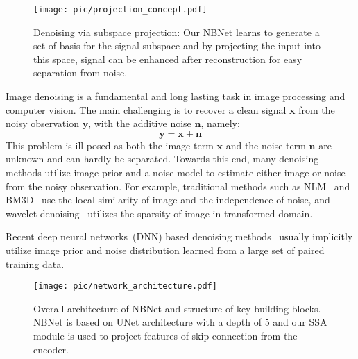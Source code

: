 \documentclass[final]{cvpr}
\newcommand{\bs}{\boldsymbol}
\newcommand{\remove}[1]{}
\begin{document}
\begin{figure}[t]
    \centering
    \texttt{[image: pic/projection\_concept.pdf]}
    \caption{Denoising via subspace projection: Our NBNet learns to generate a set of basis for the signal subspace and by projecting the input into this space, signal can be enhanced after reconstruction for easy separation from noise.}
    \label{fig:projection_concept}
\end{figure}
Image denoising is a fundamental and long lasting task in image processing and computer vision. The main challenging is to recover a clean signal $\bs{x}$ from the noisy observation $\bs{y}$, with the additive noise $\bs{n}$, namely:
\begin{equation}
    \bs{y} = \bs{x} + \bs{n}
\end{equation}
This problem is ill-posed as both the image term $\bs{x}$ and the noise term $\bs{n}$ are unknown and can hardly be separated. Towards this end, many denoising methods utilize image prior and a noise model to estimate either image or noise from the noisy observation. For example, traditional methods such as NLM~\cite{buades2005non} and BM3D~\cite{dabov2007image} use the local similarity of image and the independence of noise, and wavelet denoising~\cite{portilla2003image} utilizes the sparsity of image in transformed domain. 

Recent deep neural networks~(DNN) based denoising methods~\cite{tai2017memnet,chen2017trainable,zhou2019awgn,jain2009natural,xie2012image,mao2016image,ulyanov2018deep} usually implicitly utilize image prior and noise distribution learned from a large set of paired training data. \remove{Although previous DNNs based methods have achieved tremendous success, it still remains challenging to restore high quality images from extremely noisy ones where the noise is hard to model. Moreover, it is also problematic for those methods to distinguish flatten regions and area with weak textures, learning to over-smooth or insufficient denoising. }








\begin{figure*}[h]
    \begin{center}
        \texttt{[image: pic/network\_architecture.pdf]}
    \end{center}
    \caption{Overall architecture of NBNet and structure of key building blocks. NBNet is based on UNet architecture with a depth of 5 and our SSA module is used to project features of skip-connection from the encoder. }
    \label{fig:architecture}
\end{figure*}
\end{document}
